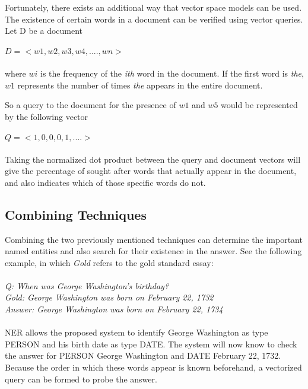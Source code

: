Fortunately, there exists an additional way that vector space models can be used. The existence of certain words in a document can be verified using vector queries. Let D be a document\\\\ $D = <w1, w2, w3, w4, ...., wn>$\\\\ where $wi$ is the frequency of the \textit{ith} word in the document. If the first word is \textit{the}, $w1$ represents the number of times \textit{the} appears in the entire document.

So a query to the document for the presence of $w1$ and $w5$ would be represented by the following vector 
\\\\
$Q=<1, 0, 0, 0, 1, ....>$
\\\\
Taking the normalized dot product between the query and document vectors will give the percentage of sought after words that actually appear in the document, and also indicates which of those specific words do not.

\subsection{Combining Techniques}
Combining the two previously mentioned techniques can determine the important named entities and also search for their existence in the answer. See the following example, in which \textit{Gold} refers to the gold standard essay:
\\\\
\textit{Q: When was George Washington's birthday?}\\
\textit{Gold: George Washington was born on February 22, 1732}\\
\textit{Answer: George Washington was born on February 22, 1734}
\\\\
NER allows the proposed system to identify George Washington as type PERSON and his birth date as type DATE. The system will now know to check the answer for PERSON George Washington and DATE February 22, 1732. Because the order in which these words appear is known beforehand, a vectorized query can be formed to probe the answer.

